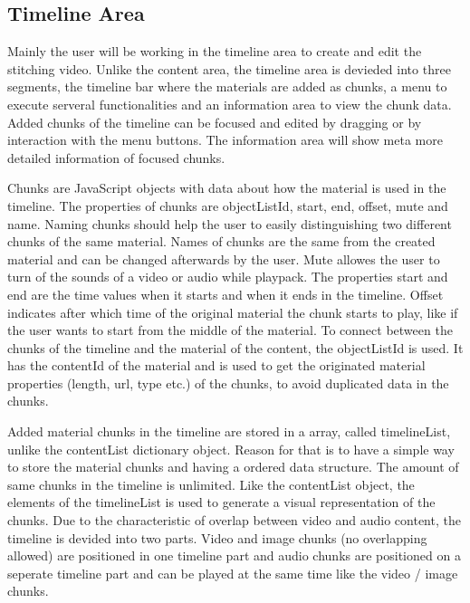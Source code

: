 \documentclass[conference]{IEEEtran}
\begin{document}
\subsection{Timeline Area}
Mainly the user will be working in the timeline area to create and edit the stitching video. Unlike the content area, the timeline area is devieded into three segments, the timeline bar where the materials are added as chunks, a menu to execute serveral functionalities and an information area to view the chunk data. Added chunks of the timeline can be focused and edited by dragging or by interaction with the menu buttons. The information area will show meta more detailed information of focused chunks.

Chunks are JavaScript objects with data about how the material is used in the timeline. The properties of chunks are objectListId, start, end, offset, mute and name. Naming chunks should help the user to easily distinguishing two different chunks of the same material. Names of chunks are the same from the created material and can be changed afterwards by the user. Mute allowes the user to turn of the sounds of a video or audio while playpack. The properties start and end are the time values when it starts and when it ends in the timeline. Offset indicates after which time of the original material the chunk starts to play, like if the user wants to start from the middle of the material. To connect between the chunks of the timeline and the material of the content, the objectListId is used. It has the contentId of the material and is used to get the originated material properties (length, url, type etc.) of the chunks, to avoid duplicated data in the chunks.

Added material chunks in the timeline are stored in a array, called timelineList, unlike the contentList dictionary object. Reason for that is to have a simple way to store the material chunks and having a ordered data structure. The amount of same chunks in the timeline is unlimited. Like the contentList object, the elements of the timelineList is used to generate a visual representation of the chunks. Due to the characteristic of overlap between video and audio content, the timeline is devided into two parts. Video and image chunks (no overlapping allowed) are positioned in one timeline part and audio chunks are positioned on a seperate timeline part and can be played at the same time like the video / image chunks.
\end{document}
